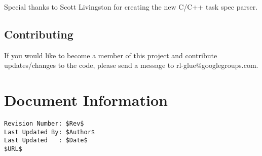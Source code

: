 \documentclass[11pt]{article}
\begin{document}
Special thanks to Scott Livingston for creating the new C/C++ task spec parser.

\subsection{Contributing}
If you would like to become a member of this project and contribute updates/changes to the code, please send a message to rl-glue@googlegroups.com.


\section*{Document Information}
\begin{verbatim}
Revision Number: $Rev$
Last Updated By: $Author$
Last Updated   : $Date$
$URL$
\end{verbatim}
\end{document}

